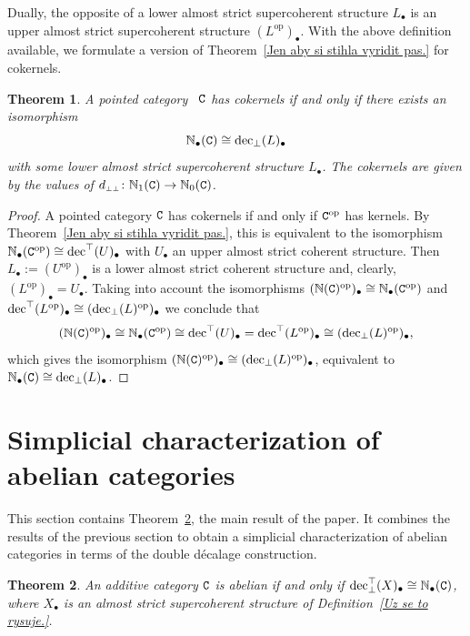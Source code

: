 \documentclass[12pt,leqno]{amsart}
\newtheorem{theorem}{Theorem}%
\theoremstyle{definition}
\def\udec{{\rm dec}^{\top}}
\def\ldec{{\rm dec}_{\bot}}
\def\uldec{{\rm dec}_{\bot}^{\top}}
\def\ttN{{\mathbb N}}
\def\dbbot{d_{\scriptscriptstyle\bot\bot}}
\newcommand{\C}{{\tt C}}
\newcommand{\NN}{\mathbb{N}}
\newcommand{\4}{\texttt{4}}
\DeclareMathOperator{\op}{op}
\begin{document}
Dually, the opposite of a lower almost strict supercoherent structure
$L_\bullet$ is an upper almost strict supercoherent structure
$(L^{\op})_\bullet$. 
With the above definition available, we formulate a version
of Theorem~\ref{Jen aby si stihla vyridit pas.} for cokernels.   

\begin{theorem}
\label{dual:Jen aby si stihla vyridit pas.}
A pointed category \ $\C$ has cokernels if and only
if there exists an isomorphism 
\[
\ttN_\bullet(\C) \cong\ldec(L)_\bullet
\]
with  some lower almost strict supercoherent structure $L_\bullet$. 
The cokernels are given by the values of 
$\dbbot\colon \NN_{1}(\C)\to \NN_0(\C)$.\end{theorem}

\begin{proof}
A pointed category $\C$ has cokernels if and only if $\C^{\op}$ has
kernels. By Theorem~\ref{Jen aby si stihla vyridit pas.}, this is
equivalent to the isomorphism
$\NN_\bullet(\C^{\op})\cong \udec(U)_\bullet$ with $U_\bullet$ 
an upper almost strict coherent structure. Then
$L_\bullet:=(U^{\op})_\bullet$ is a lower almost strict coherent 
structure and, clearly,
\hbox{$(L^{\op})_\bullet=U_\bullet$}. Taking into
account the isomorphisms
$(\NN(\C)^{\op})_\bullet \cong \NN_\bullet(\C^{\op})$ and
$\udec(L^{\op})_\bullet \cong (\ldec (L)^{\op})_\bullet$
we conclude that
\[
(\NN(\C)^{\op})_\bullet\cong \NN_\bullet(\C^{\op})\cong
\udec(U)_\bullet=\udec(L^{\op})_\bullet \cong (\ldec (L)^{\op})_\bullet,
\]
which gives the isomorphism $(\NN(\C)^{\op})_\bullet\cong (\ldec
(L)^{\op})_\bullet$,  
equivalent to $\NN_\bullet(\C)\cong \ldec(L)_\bullet$. 
\end{proof}

\section{Simplicial characterization of abelian categories}
\label{Pozitri zacina moje konfernce.}


This section contains Theorem~\ref{hlavni}, the main result of the
paper. It combines the results of the previous section to obtain a 
simplicial characterization of abelian categories in terms of the double d\'ecalage construction.




\begin{theorem}
\label{hlavni}
An additive category $\C$ is abelian if and only if
$\uldec (X)_\bullet\cong \NN_\bullet(\C)$, where $X_\bullet$ is an
almost strict supercoherent structure of Definition~\ref{Uz se to
  rysuje.}.
    \end{theorem}
\end{document}
